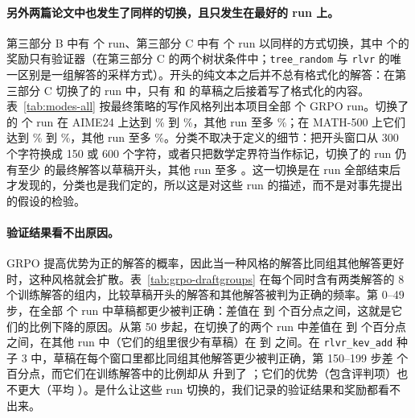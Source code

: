 \begin{table}[t]
\centering\small

\caption{以非正式草稿开头（前 300 个字符中没有数学定界符、markdown 标题或粗体）的 MATH-500 解答所占比例：每次定期评估（贪心，每 50 步）和最终评估，逐个 run 列出，并附最终准确率。}
\label{tab:grpo-drafts}
\end{table}

\paragraph{另外两篇论文中也发生了同样的切换，且只发生在最好的 run 上。} 第三部分 B 中有  个 run、第三部分 C 中有  个 run 以同样的方式切换，其中  个的奖励只有验证器（在第三部分 C 的两个树状条件中；\texttt{tree\_random} 与 \texttt{rlvr} 的唯一区别是一组解答的采样方式）。开头的纯文本之后并不总有格式化的解答：在第三部分 C 切换了的 run 中，只有  和  的草稿之后接着写了格式化的内容。表~\ref{tab:modes-all} 按最终策略的写作风格列出本项目全部  个 GRPO run。切换了的  个 run 在 AIME24 上达到 \% 到 \%，其他 run 至多 \%；在 MATH-500 上它们达到 \% 到 \%，其他 run 至多 \%。分类不取决于定义的细节：把开头窗口从 300 个字符换成 150 或 600 个字符，或者只把数学定界符当作标记，切换了的 run 仍有至少  的最终解答以草稿开头，其他 run 至多 。这一切换是在 run 全部结束后才发现的，分类也是我们定的，所以这是对这些 run 的描述，而不是对事先提出的假设的检验。

\paragraph{验证结果看不出原因。} GRPO 提高优势为正的解答的概率，因此当一种风格的解答比同组其他解答更好时，这种风格就会扩散。表~\ref{tab:grpo-draftgroups} 在每个同时含有两类解答的 8 个训练解答的组内，比较草稿开头的解答和其他解答被判为正确的频率。第 0--49 步，在全部  个 run 中草稿都更少被判正确：差值在  到  个百分点之间，这就是它们的比例下降的原因。从第 50 步起，在切换了的两个 run 中差值在  到  个百分点之间，在其他 run 中（它们的组里很少有草稿）在  到  之间。在 \texttt{rlvr\_kev\_add} 种子 3 中，草稿在每个窗口里都比同组其他解答更少被判正确，第 150--199 步差  个百分点，而它们在训练解答中的比例却从  升到了 ；它们的优势（包含评判项）也不更大（平均 ）。是什么让这些 run 切换的，我们记录的验证结果和奖励都看不出来。

